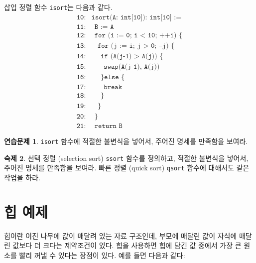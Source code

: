 \documentclass{oblivoir}
\theoremstyle{definition}
\newtheorem{exercise}{연습문제}
\newtheorem{homework}[exercise]{숙제}
\begin{document}
삽입 정렬 함수 \texttt{isort}는 다음과 같다.
\begin{align*}
\texttt{10:}& \texttt{isort(A: int[10]): int[10] :=} \\
\texttt{11:}& \ \ \texttt{B := A} \\
\texttt{12:}& \ \ \texttt{for (i := 0; i < 10; ++i) \{} \\
\texttt{13:}& \ \ \ \ \texttt{for (j := i; j > 0; --j) \{} \\
\texttt{14:}& \ \ \ \ \ \ \texttt{if (A(j-1) > A(j)) \{} \\
\texttt{15:}& \ \ \ \ \ \ \ \ \texttt{swap(A(j-1), A(j))} \\
\texttt{16:}& \ \ \ \ \ \ \texttt{\} else \{} \\
\texttt{17:}& \ \ \ \ \ \ \ \ \texttt{break} \\
\texttt{18:}& \ \ \ \ \ \ \texttt{\}} \\
\texttt{19:}& \ \ \ \ \texttt{\}} \\
\texttt{20:}& \ \ \texttt{\}} \\
\texttt{21:}& \ \ \texttt{return B}
\end{align*}

\begin{exercise}
  \texttt{isort} 함수에 적절한 불변식을 넣어서, 주어진 명세를
  만족함을 보여라.
\end{exercise}

\begin{homework}
  선택 정렬 (selection sort) \texttt{ssort} 함수를 정의하고, 적절한
  불변식을 넣어서, 주어진 명세를 만족함을 보여라.  빠른 정렬 (quick
  sort) \texttt{qsort} 함수에 대해서도 같은 작업을 하라.
\end{homework}

\section{힙 예제}

힙이란 이진 나무에 값이 매달려 있는 자료 구조인데, 부모에 매달린 값이
자식에 매달린 값보다 더 크다는 제약조건이 있다.  힙을 사용하면 힙에
담긴 값 중에서 가장 큰 원소를 빨리 꺼낼 수 있다는 장점이 있다.  예를
들면 다음과 같다:

\begin{center}
\end{center}
\end{document}
